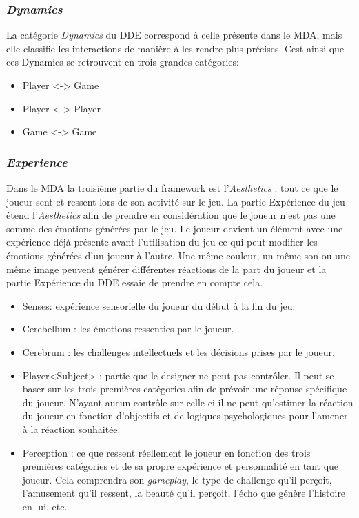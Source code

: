 \subsubsection{\emph{Dynamics} }
    La catégorie \emph{Dynamics} du DDE correspond à celle présente dans le MDA, mais elle classifie les interactions de manière à les rendre plus précises. Cest ainsi que ces Dynamics se retrouvent en trois grandes catégories: 
    \begin{itemize}
        \item Player <-> Game
        \item Player <-> Player
        \item Game <-> Game
    \end{itemize}

\subsubsection{\emph{Experience}}
    Dans le MDA la troisième partie du framework est l'\emph{Aesthetics} : tout ce que le joueur sent et ressent lors de son activité sur le jeu. La partie Expérience du jeu étend l'\emph{Aesthetics} afin de prendre en considération que le joueur n'est pas une somme des émotions générées par le jeu. Le joueur devient un élément avec une expérience déjà présente avant l'utilisation du jeu ce qui peut modifier les émotions générées d'un joueur à l'autre. Une même couleur, un même son ou une même image peuvent générer différentes réactions de la part du joueur et la partie Expérience du DDE essaie de prendre en compte cela.
    \begin{itemize}
        \item Senses: expérience sensorielle du joueur du début à la fin du jeu.
        \item Cerebellum : les émotions ressenties par le joueur.
        \item Cerebrum : les challenges intellectuels et les décisions prises par le joueur.
        \item Player<Subject> : partie que le designer ne peut pas contrôler. Il peut se baser sur les trois premières catégories afin de prévoir une réponse spécifique du joueur. N'ayant aucun contrôle sur celle-ci il ne peut qu'estimer la réaction du joueur en fonction d'objectifs et de logiques psychologiques pour l'amener à la réaction souhaitée.
        \item Perception : ce que ressent réellement le joueur en fonction des trois premières catégories et de sa propre expérience et personnalité en tant que joueur. Cela comprendra son \emph{gameplay}, le type de challenge qu'il perçoit, l'amusement qu'il ressent, la beauté qu'il perçoit, l'écho que génère l'histoire en lui, etc.
    \end{itemize}


